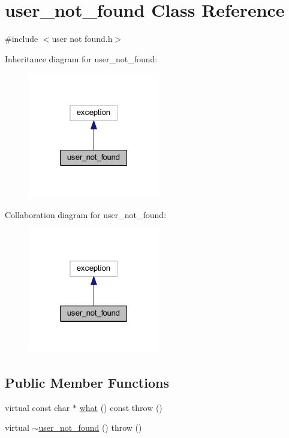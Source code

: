\hypertarget{classuser__not__found}{}\section{user\+\_\+not\+\_\+found Class Reference}
\label{classuser__not__found}


{\ttfamily \#include $<$user not found.\+h$>$}



Inheritance diagram for user\+\_\+not\+\_\+found\+:\nopagebreak
\begin{figure}[H]
\begin{center}
\leavevmode
\includegraphics[width=163pt]{classuser__not__found__inherit__graph}
\end{center}
\end{figure}


Collaboration diagram for user\+\_\+not\+\_\+found\+:\nopagebreak
\begin{figure}[H]
\begin{center}
\leavevmode
\includegraphics[width=163pt]{classuser__not__found__coll__graph}
\end{center}
\end{figure}
\subsection*{Public Member Functions}
\begin{DoxyCompactItemize}
\item 
virtual const char $\ast$ \hyperlink{classuser__not__found_a3c321063325306e880d515ea2994cd8b}{what} () const   throw ()
\item 
virtual \hyperlink{classuser__not__found_acc5145fbe86a9f9b7ad22f86b9e4a9fd}{$\sim$user\+\_\+not\+\_\+found} ()  throw ()
\end{DoxyCompactItemize}


